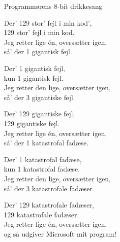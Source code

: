 \begin{song}{Programmørens 8-bit drikkesang}
  \begin{SBVerse}
    Der' 129 stor' fejl i min kod',\\
    129 stor' fejl i min kod.\\
    Jeg retter lige én, oversætter igen,\\
    så' der 1 gigantisk fejl.
  \end{SBVerse}

  \begin{SBVerse}
    Der' 1 gigantisk fejl,\\
    kun 1 gigantisk fejl.\\
    Jeg retter den lige, oversætter igen,\\
    så' der 3 gigantiske fejl.
  \end{SBVerse}

  \begin{SBVerse}
    Der' 129 gigantiske fejl,\\
    129 gigantiske fejl.\\
    Jeg retter lige én, oversætter igen,\\
    så' der 1 katastrofal fadæse.
  \end{SBVerse}

  \begin{SBVerse}
    Der' 1 katastrofal fadæse,\\
    kun 1 katastrofal fadæse.\\
    Jeg retter den lige, oversætter igen,\\
    så' der 3 katastrofale fadæser.
  \end{SBVerse}

  \begin{SBVerse}
    Der' 129 katastrofale fadæser,\\
    129 katastrofale fadæser.\\
    Jeg retter lige én, oversætter igen,\\
    og så udgiver Microsoft mit program!
  \end{SBVerse}
\end{song}